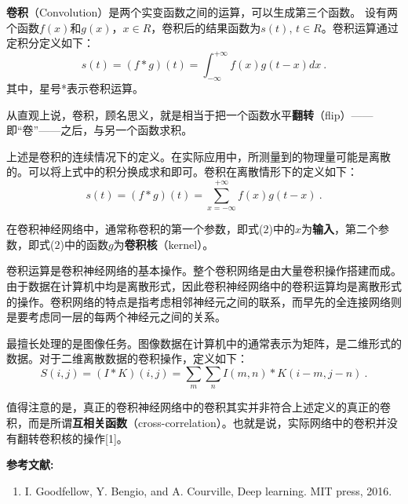 


\textbf{卷积}（Convolution）是两个实变函数之间的运算，可以生成第三个函数。
设有两个函数$f(x)$和$g(x)$，$x \in R$，卷积后的结果函数为$s(t)$, $t \in R$。卷积运算通过定积分定义如下：
\begin{equation}
s(t) = (f*g)(t) = \int_{ - \infty }^{ + \infty } {f(x)g(t - x)dx}~.
\end{equation}
其中，星号*表示卷积运算。

从直观上说，卷积，顾名思义，就是相当于把一个函数水平\textbf{翻转}（flip）——即“卷”——之后，与另一个函数求积。

上述是卷积的连续情况下的定义。在实际应用中，所测量到的物理量可能是离散的。可以将上式中的积分换成求和即可。卷积在离散情形下的定义如下：
\begin{equation}
s(t) = (f*g)(t) = \sum_{ x = - \infty }^{ + \infty } {f(x)g(t - x)}~.
\end{equation}

在卷积神经网络中，通常称卷积的第一个参数，即式($2$)中的$x$为\textbf{输入}，第二个参数，即式($2$)中的函数$g$为\textbf{卷积核}（kernel）。

卷积运算是卷积神经网络的基本操作。整个卷积网络是由大量卷积操作搭建而成。由于数据在计算机中均是离散形式，因此卷积神经网络中的卷积运算均是离散形式的操作。卷积网络的特点是指考虑相邻神经元之间的联系，而早先的全连接网络则是要考虑同一层的每两个神经元之间的关系。

最擅长处理的是图像任务。图像数据在计算机中的通常表示为矩阵，是二维形式的数据。对于二维离散数据的卷积操作，定义如下：
\begin{equation}
S(i,j) = (I*K)(i,j) = \sum_{m}\sum_{n}I(m,n)*K(i-m,j-n)~.
\end{equation}

值得注意的是，真正的卷积神经网络中的卷积其实并非符合上述定义的真正的卷积，而是所谓\textbf{互相关函数}（cross-correlation）。也就是说，实际网络中的卷积并没有翻转卷积核的操作[1]。


\textbf{参考文献:}
\begin{enumerate}
\item I. Goodfellow, Y. Bengio, and A. Courville, Deep learning. MIT press, 2016.
\end{enumerate}
